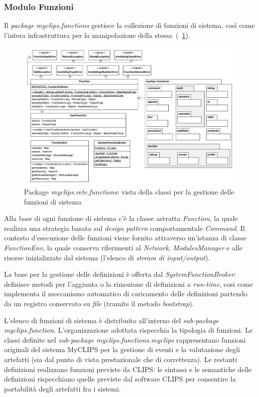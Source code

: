 \subsubsection{Modulo Funzioni}
Il \emph{package} \emph{myclips.functions} gestisce la collezione di funzioni di sistema, così come l'intera infrastruttura per la manipolazione della stessa~(\figurename~\ref{fig:class-myclips-functions}).

\begin{figure}
\centering
\includegraphics[width=1.3\textwidth, angle=270]{Immagini/Capitolo3/Classi/myclips_functions-Globale.png}
\caption{Package \emph{myclips.rete.functions}: vista della classi per la gestione delle funzioni di sistema}\label{fig:class-myclips-functions}
\end{figure}

Alla base di ogni funzione di sistema c'è la classe astratta \emph{Function}, la quale realizza una strategia basata sul \emph{design pattern} comportamentale \emph{Command}. Il contesto d'esecuzione delle funzioni viene fornito attraverso un'istanza di classe \emph{FunctionEnv}, la quale conserva riferimenti al \emph{Network}, \emph{ModulesManager} e alle risorse inizializzate dal sistema (l'elenco di \emph{stream di input/output}).

La base per la gestione delle definizioni è offerta dal \emph{SystemFunctionBroker}: definisce metodi per l'aggiunta o la rimozione di definizioni a \emph{run-time}, cosi come implementa il meccanismo automatico di caricamento delle definizioni partendo da un registro conservato su \emph{file} (tramite il metodo \emph{bootstrap}).

L'elenco di funzioni di sistema è distribuito all'interno del \emph{sub-package} \emph{myclips.function}. L'organizzazione adottata rispecchia la tipologia di funzioni. Le classi definite nel \emph{sub-package} \emph{myclips.functions.myclips} rappresentano funzioni originali del sistema MyCLIPS per la gestione di eventi e la valutazione degli artefatti (sia dal punto di vista prestazionale che di correttezza). Le restanti definizioni realizzano funzioni previste da CLIPS: le sintassi e le semantiche delle definizioni rispecchiano quelle previste dal software CLIPS per consentire la portabilità degli artefatti fra i sistemi.

